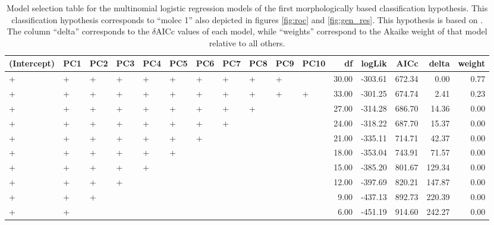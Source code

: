 \documentclass[12pt,letterpaper]{article}\usepackage{graphicx, color}
\begin{document}
\begin{table}
  \centering
{\small
\begin{tabular}{lllllllllllrrrrr}
  \hline
(Intercept) & PC1 & PC2 & PC3 & PC4 & PC5 & PC6 & PC7 & PC8 & PC9 & PC10 & df & logLik & AICc & delta & weight \\ 
  \hline
+ & + & + & + & + & + & + & + & + & + &  & 30.00 & -303.61 & 672.34 & 0.00 & 0.77 \\ 
  + & + & + & + & + & + & + & + & + & + & + & 33.00 & -301.25 & 674.74 & 2.41 & 0.23 \\ 
  + & + & + & + & + & + & + & + & + &  &  & 27.00 & -314.28 & 686.70 & 14.36 & 0.00 \\ 
  + & + & + & + & + & + & + & + &  &  &  & 24.00 & -318.22 & 687.70 & 15.37 & 0.00 \\ 
  + & + & + & + & + & + & + &  &  &  &  & 21.00 & -335.11 & 714.71 & 42.37 & 0.00 \\ 
  + & + & + & + & + & + &  &  &  &  &  & 18.00 & -353.04 & 743.91 & 71.57 & 0.00 \\ 
  + & + & + & + & + &  &  &  &  &  &  & 15.00 & -385.20 & 801.67 & 129.34 & 0.00 \\ 
  + & + & + & + &  &  &  &  &  &  &  & 12.00 & -397.69 & 820.21 & 147.87 & 0.00 \\ 
  + & + & + &  &  &  &  &  &  &  &  & 9.00 & -437.13 & 892.73 & 220.39 & 0.00 \\ 
  + & + &  &  &  &  &  &  &  &  &  & 6.00 & -451.19 & 914.60 & 242.27 & 0.00 \\ 
   \hline
\end{tabular}
}


  \caption{Model selection table for the multinomial logistic regression models of the first morphologically based classification hypothesis. This classification hypothesis corresponds to ``molec 1'' also depicted in figures \ref{fig:roc} and \ref{fig:gen_res}. This hypothesis is based on \citet{Seeliger1945}. The column ``delta'' corresponds to the \(\delta\)AICc values of each model, while ``weights'' correspond to the Akaike weight of that model relative to all others.}
  \label{tab:mod_sel_3}
\end{table}
\end{document}
